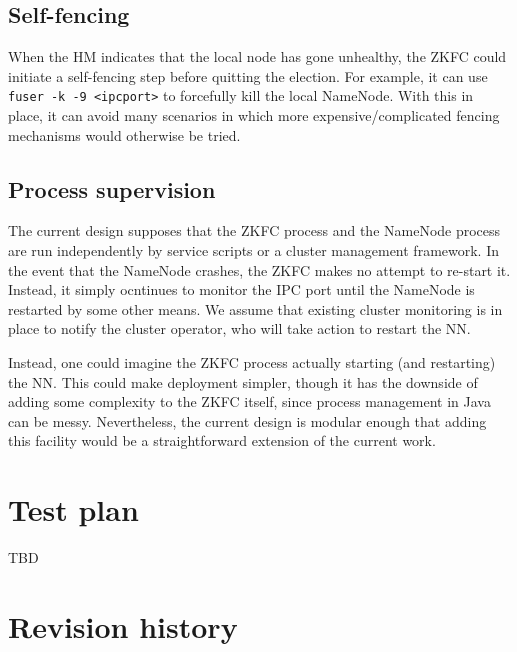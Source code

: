 \documentclass{article}
\begin{document}
\subsection{Self-fencing}

When the HM indicates that the local node has gone unhealthy, the ZKFC could initiate a self-fencing step before quitting the election. For example, it can use {\tt fuser -k -9 <ipcport>} to forcefully kill the local NameNode. With this in place, it can avoid many scenarios in which more expensive/complicated fencing mechanisms would otherwise be tried.

\subsection{Process supervision}
The current design supposes that the ZKFC process and the NameNode process are run independently by service scripts or a cluster management framework. In the event that the NameNode crashes, the ZKFC makes no attempt to re-start it. Instead, it simply ocntinues to monitor the IPC port until the NameNode is restarted by some other means. We assume that existing cluster monitoring is in place to notify the cluster operator, who will take action to restart the NN.

Instead, one could imagine the ZKFC process actually starting (and restarting) the NN. This could make deployment simpler, though it has the downside of adding some complexity to the ZKFC itself, since process management in Java can be messy. Nevertheless, the current design is modular enough that adding this facility would be a  straightforward extension of the current work.

\section{Test plan}

TBD

\section{Revision history}


\end{document}
